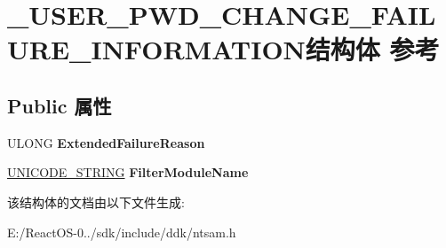 \hypertarget{struct___u_s_e_r___p_w_d___c_h_a_n_g_e___f_a_i_l_u_r_e___i_n_f_o_r_m_a_t_i_o_n}{}\section{\+\_\+\+U\+S\+E\+R\+\_\+\+P\+W\+D\+\_\+\+C\+H\+A\+N\+G\+E\+\_\+\+F\+A\+I\+L\+U\+R\+E\+\_\+\+I\+N\+F\+O\+R\+M\+A\+T\+I\+O\+N结构体 参考}
\label{struct___u_s_e_r___p_w_d___c_h_a_n_g_e___f_a_i_l_u_r_e___i_n_f_o_r_m_a_t_i_o_n}
\subsection*{Public 属性}
\begin{DoxyCompactItemize}
\item 
\mbox{\label{struct___u_s_e_r___p_w_d___c_h_a_n_g_e___f_a_i_l_u_r_e___i_n_f_o_r_m_a_t_i_o_n_a73234459a0f421ca3240c1a3054d15d9}} 
U\+L\+O\+NG {\bfseries Extended\+Failure\+Reason}
\item 
\mbox{\label{struct___u_s_e_r___p_w_d___c_h_a_n_g_e___f_a_i_l_u_r_e___i_n_f_o_r_m_a_t_i_o_n_a836595248fe51e1deb608e77f2e0129f}} 
\hyperlink{struct___u_n_i_c_o_d_e___s_t_r_i_n_g}{U\+N\+I\+C\+O\+D\+E\+\_\+\+S\+T\+R\+I\+NG} {\bfseries Filter\+Module\+Name}
\end{DoxyCompactItemize}


该结构体的文档由以下文件生成\+:\begin{DoxyCompactItemize}
\item 
E\+:/\+React\+O\+S-\/0../sdk/include/ddk/ntsam.\+h\end{DoxyCompactItemize}
